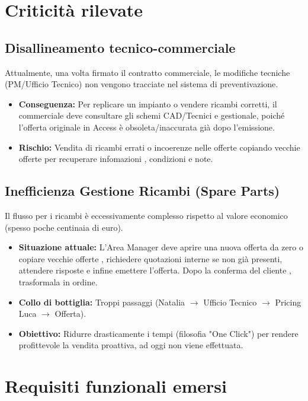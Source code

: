 \documentclass[12pt, a4paper]{article} %
\begin{document}
\section{Criticità rilevate}
\subsection{Disallineamento tecnico-commerciale}
Attualmente, una volta firmato il contratto commerciale, le modifiche tecniche (PM/Ufficio Tecnico)
non vengono tracciate nel sistema di preventivazione.
\begin{itemize}
    \item \textbf{Conseguenza:} Per replicare un impianto o vendere ricambi corretti, il commerciale deve consultare gli schemi CAD/Tecnici e gestionale,
          poiché l'offerta originale in Access è obsoleta/inaccurata già dopo l'emissione.
    \item \textbf{Rischio:} Vendita di ricambi errati o incoerenze nelle offerte copiando vecchie offerte per recuperare infomazioni , condizioni e note.
\end{itemize}

\subsection{Inefficienza Gestione Ricambi (Spare Parts)}
Il flusso per i ricambi è eccessivamente complesso rispetto al valore economico
(spesso poche centinaia di euro).
\begin{itemize}
    \item \textbf{Situazione attuale:} L'Area Manager deve aprire una nuova offerta da zero o copiare vecchie offerte , richiedere
          quotazioni interne se non già presenti, attendere risposte e infine emettere l'offerta. Dopo la conferma del cliente , trasformala in ordine.
    \item \textbf{Collo di bottiglia:} Troppi passaggi (Natalia $\to$ Ufficio Tecnico $\to$ Pricing Luca $\to$ Offerta).
    \item \textbf{Obiettivo:} Ridurre drasticamente i tempi (filosofia "One Click") per rendere profittevole la vendita proattiva, ad oggi non viene effettuata.
\end{itemize}

\section{Requisiti funzionali emersi}
\end{document}
